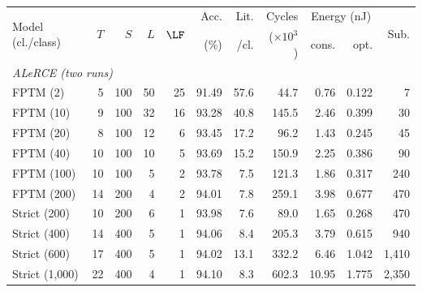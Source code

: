 
\begin{table}[!htbp]
\centering
\caption{}
\label{tab:energyhp}
\footnotesize
\setlength{\tabcolsep}{3.5pt}
\textcolor{wosnewcolor}{%
\begin{tabular}{lrrrrrrrrrr}
\toprule
\multirow{2}{*}{Model (cl./class)} & \multirow{2}{*}{$T$} & \multirow{2}{*}{$S$} & \multirow{2}{*}{$L$} & \multirow{2}{*}{$\LF$} & Acc. & Lit. & Cycles & \multicolumn{2}{c}{Energy (nJ)} & \multirow{2}{*}{Sub.} \\
 & & & & & (\%) & /cl. & ($\times10^3$) & cons. & opt. & \\
\midrule
\multicolumn{11}{l}{\emph{ALeRCE (two runs)}}\\
FPTM (2) & 5 & 100 & 50 & 25 & 91.49 & 57.6 & 44.7 & 0.76 & 0.122 & 7 \\
FPTM (10) & 9 & 100 & 32 & 16 & 93.28 & 40.8 & 145.5 & 2.46 & 0.399 & 30 \\
FPTM (20) & 8 & 100 & 12 & 6 & 93.45 & 17.2 & 96.2 & 1.43 & 0.245 & 45 \\
FPTM (40) & 10 & 100 & 10 & 5 & 93.69 & 15.2 & 150.9 & 2.25 & 0.386 & 90 \\
FPTM (100) & 10 & 100 & 5 & 2 & 93.78 & 7.5 & 121.3 & 1.86 & 0.317 & 240 \\
FPTM (200) & 14 & 200 & 4 & 2 & 94.01 & 7.8 & 259.1 & 3.98 & 0.677 & 470 \\
Strict (200) & 10 & 200 & 6 & 1 & 93.98 & 7.6 & 89.0 & 1.65 & 0.268 & 470 \\
Strict (400) & 14 & 400 & 5 & 1 & 94.06 & 8.4 & 205.3 & 3.79 & 0.615 & 940 \\
Strict (600) & 17 & 400 & 5 & 1 & 94.02 & 13.1 & 332.2 & 6.46 & 1.042 & 1,410 \\
Strict (1,000) & 22 & 400 & 4 & 1 & 94.10 & 8.3 & 602.3 & 10.95 & 1.775 & 2,350 \\

\end{tabular}}
\end{table}
